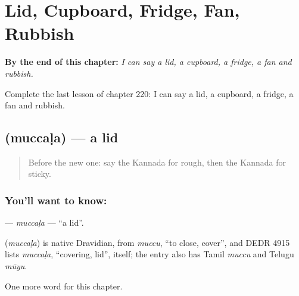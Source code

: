 
\chapter{Lid, Cupboard, Fridge, Fan, Rubbish}
\label{ch:ka-lid-cupboard-fridge-fan-rubbish}

\begin{chapteropening}
\textbf{By the end of this chapter:} \emph{I can say a lid, a cupboard, a fridge, a fan and rubbish.}

Complete the last lesson of chapter 220: I can say a lid, a cupboard, a fridge, a fan and rubbish.
\end{chapteropening}

\section[\texorpdfstring{\kn{ಮುಚ್ಚಳ} (muccaḷa)}{ಮುಚ್ಚಳ (muccaḷa)}]{ (muccaḷa) — a lid}

\label{lesson:KA-C220-muccala}



\begin{quote}
Before the new one: say the Kannada for rough, then the Kannada for sticky.
\end{quote}

\subsection*{You'll want to know: }
\textbf{} — \emph{muccaḷa} — \textquotedblleft{}a lid\textquotedblright{}.

\begin{cousinweb}
\textbf{} (\emph{muccaḷa}) is native Dravidian, from \emph{muccu}, \textquotedblleft{}to close, cover\textquotedblright{}, and DEDR 4915 lists \emph{muccaḷa}, \textquotedblleft{}covering, lid\textquotedblright{}, itself; the entry also has Tamil \emph{muccu} and Telugu \emph{mūyu}.
\end{cousinweb}

\begin{grammarlens}[title={What you've built}]
One more word for this chapter.
\end{grammarlens}

